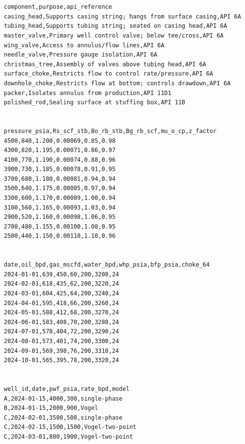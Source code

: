 \documentclass[10pt,a4paper,openany]{book}
\begin{document}
\chapter{}
\begin{lstlisting}[style=plain]
component,purpose,api_reference
casing_head,Supports casing string; hangs from surface casing,API 6A
tubing_head,Supports tubing string; seated on casing head,API 6A
master_valve,Primary well control valve; below tee/cross,API 6A
wing_valve,Access to annulus/flow lines,API 6A
needle_valve,Pressure gauge isolation,API 6A
christmas_tree,Assembly of valves above tubing head,API 6A
surface_choke,Restricts flow to control rate/pressure,API 6A
downhole_choke,Restricts flow at bottom; controls drawdown,API 6A
packer,Isolates annulus from production,API 11D1
polished_rod,Sealing surface at stuffing box,API 11B
\end{lstlisting}

\chapter{}
\begin{lstlisting}[style=plain]
pressure_psia,Rs_scf_stb,Bo_rb_stb,Bg_rb_scf,mu_o_cp,z_factor
4500,840,1.200,0.00069,0.85,0.98
4300,820,1.195,0.00071,0.86,0.97
4100,770,1.190,0.00074,0.88,0.96
3900,730,1.185,0.00078,0.91,0.95
3700,680,1.180,0.00081,0.94,0.94
3500,640,1.175,0.00085,0.97,0.94
3300,600,1.170,0.00089,1.00,0.94
3100,560,1.165,0.00093,1.03,0.94
2900,520,1.160,0.00098,1.06,0.95
2700,480,1.155,0.00100,1.08,0.95
2500,440,1.150,0.00110,1.10,0.96
\end{lstlisting}

\chapter{}
\begin{lstlisting}[style=plain]
date,oil_bpd,gas_mscfd,water_bpd,whp_psia,bfp_psia,choke_64
2024-01-01,639,450,60,200,3200,24
2024-02-01,618,435,62,200,3220,24
2024-03-01,604,425,64,200,3240,24
2024-04-01,595,418,66,200,3260,24
2024-05-01,588,412,68,200,3270,24
2024-06-01,583,408,70,200,3280,24
2024-07-01,578,404,72,200,3290,24
2024-08-01,573,401,74,200,3300,24
2024-09-01,569,398,76,200,3310,24
2024-10-01,565,395,78,200,3320,24
\end{lstlisting}

\chapter{}
\begin{lstlisting}[style=plain]
well_id,date,pwf_psia,rate_bpd,model
A,2024-01-15,4000,300,single-phase
B,2024-01-15,2000,900,Vogel
C,2024-02-01,3500,500,single-phase
C,2024-02-15,1500,1500,Vogel-two-point
C,2024-03-01,800,1900,Vogel-two-point
\end{lstlisting}
\end{document}
